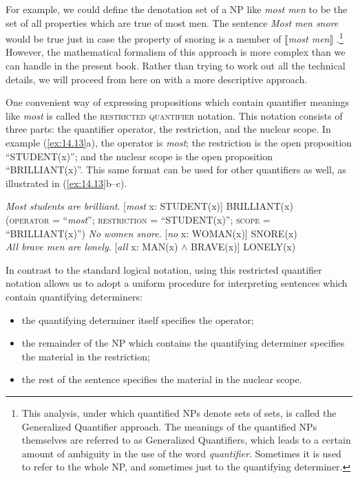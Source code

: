 For example, we could define the denotation set of a NP like \textit{most men} to be the set of all properties which are true of most men. The sentence \textit{Most men snore} would be true just in case the property of snoring is a member of $\llbracket$\textit{most men}$\rrbracket$ .\footnote{This analysis, under which quantified NPs denote sets of sets, is called the Generalized Quantifier approach. The meanings of the quantified NPs themselves are referred to as Generalized Quantifiers, which leads to a certain amount of ambiguity in the use of the word \textit{quantifier}. Sometimes it is used to refer to the whole NP, and sometimes just to the quantifying determiner.} However, the mathematical formalism of this approach is more complex than we can handle in the present book. Rather than trying to work out all the technical details, we will proceed from here on with a more descriptive approach.



One convenient way of expressing propositions which contain quantifier meanings like \textit{most} is called the \textsc{restricted quantifier} notation. This notation consists of three parts: the quantifier operator, the restriction, and the nuclear scope. In example (\ref{ex:14.13}a), the operator is \textit{most}; the restriction is the open proposition “STUDENT(x)”; and the nuclear scope is the open proposition “BRILLIANT(x)”. This same format can be used for other quantifiers as well, as illustrated in (\ref{ex:14.13}b--c).


\ea \label{ex:14.13}
\ea \textit{Most students are brilliant}.  [\textit{most} x: STUDENT(x)] BRILLIANT(x)\\
\textsc{(operator} = “\textit{most}”; \textsc{restriction} = “STUDENT(x)”; \textsc{scope} = “BRILLIANT(x)”)
\ex  \textit{No women snore}.  [\textit{no} x: WOMAN(x)] SNORE(x)\\
\ex \textit{All brave men are lonely}.  [\textit{all} x: MAN(x) $\wedge$ BRAVE(x)] LONELY(x)
\z \z


In contrast to the standard logical notation, using this restricted quantifier notation allows us to adopt a uniform procedure for interpreting sentences which contain quantifying determiners:


\begin{itemize}
\item the quantifying determiner itself specifies the operator;
\item the remainder of the NP which contains the quantifying determiner specifies the material in the restriction;
\item the rest of the sentence specifies the material in the nuclear scope.
\end{itemize}

